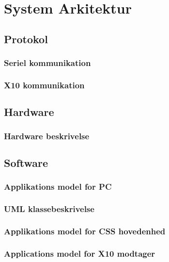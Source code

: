 %
%
\chapter{System Arkitektur}

\section{Protokol}

\subsection{Seriel kommunikation}


\newpage
\subsection{X10 kommunikation}


\newpage
\section{Hardware}

\subsection{Hardware beskrivelse}


\newpage
\section{Software}

\subsection{Applikations model for PC}

\clearpage

\subsection{UML klassebeskrivelse}

\newpage

\subsection{Applikations model for CSS hovedenhed}


\newpage
\subsection{Applications model for X10 modtager}


